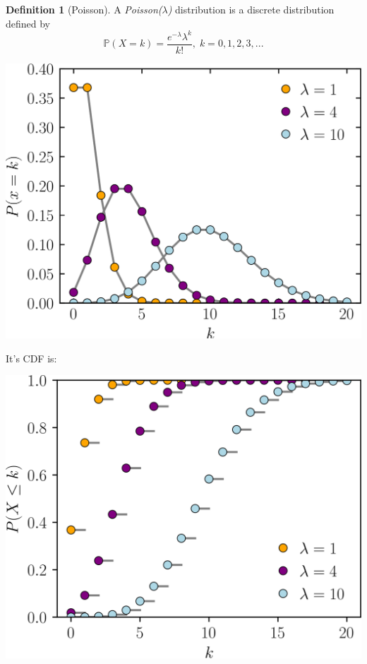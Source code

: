 \documentclass{article}
\theoremstyle{remark}
\theoremstyle{definition}
\newtheorem{definition}{Definition}[section]
\begin{document}
\begin{definition}[Poisson]
A \textit{Poisson($\lambda$)} distribution is a discrete distribution defined by 
\[\mathbb{P}(X = k) = \frac{e^{-\lambda} \lambda^k}{k!}, \; k = 0, 1, 2, 3, ...\]
\begin{center}
    \includegraphics[scale=0.15]{img/Poisson_Distribution_Model.png}
\end{center}
It's CDF is: 
\begin{center}
    \includegraphics[scale=0.15]{img/Poisson_Distribution_Model_2.png}
\end{center}
\end{definition}
\end{document}
